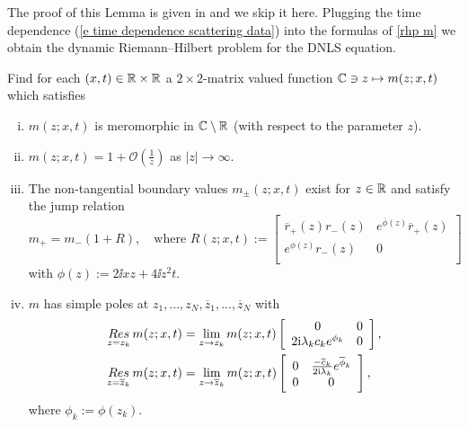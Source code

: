 The proof of this Lemma is given in \cite[Section 5]{Pelinovsky2016} and we skip it here. Plugging the time dependence (\ref{e time dependence scattering data}) into the formulas of \rh \ref{rhp m} we obtain the dynamic Riemann--Hilbert problem for the DNLS equation.
\begin{samepage}
\begin{framed}
\begin{rhp}\label{rhp m dynamic}
Find for each $(x,t)\in\mathbb R\times\mathbb R$ a $2\times 2$-matrix valued function $\mathbb C\ni z\mapsto m(z;x,t)$ which satisfies
\begin{enumerate}[(i)]
  \item $m(z;x,t)$ is meromorphic in $\mathbb C\setminus\mathbb R$ (with respect to the parameter $z$).
  \item $m(z;x,t)=1+\mathcal{O}\left(\frac{1}{z}\right)$ as $|z|\to\infty$.
  \item The non-tangential boundary values $m_{\pm}(z;x,t)$ exist for $z\in\mathbb R$ and satisfy the jump relation
      \begin{equation*}%
        m_+=m_-(1+R),\quad\text{where }
        R(z;x,t):=
        \left[
          \begin{array}{cc}
            \overline{r}_+(z)r_-(z) & e^{\overline{\phi}(z)}\overline{r}_+(z) \\
            e^{\phi(z)}r_-(z) & 0 \\
          \end{array}
        \right]
      \end{equation*}
      with $\phi(z):=2\ii xz+4\ii z^2t$.
  \item $m$ has simple poles at $z_1,...,z_N,\overline{z}_1,...,\overline{z}_N$ with
      \begin{equation}\label{e Res}
        \begin{aligned}
          \mathop{Res}_{z=z_k}m(z;x,t)&=\lim_{z\to z_k}m(z;x,t)
          \left[
            \begin{array}{cc}
              0 & 0 \\
              2\mathrm{i}\lambda_kc_k e^{\phi_k} & 0
            \end{array}
          \right],\\
          \mathop{Res}_{z=\overline{z}_k}m(z;x,t)&=\lim_{z\to \overline{z}_k}m(z;x,t)
          \left[
            \begin{array}{cc}
              0 & \frac{-\overline{c}_k}{2\mathrm{i}\lambda_k} e^{\overline{\phi}_k} \\
              0 & 0
            \end{array}
          \right],
        \end{aligned}
      \end{equation}
      where $\phi_k:=\phi(z_k)$.
\end{enumerate}
\end{rhp}
\end{framed}
\end{samepage}
